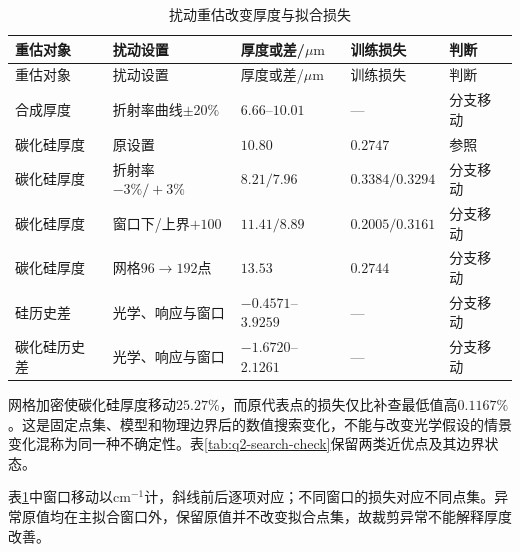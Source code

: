 \begingroup
\small
\setlength{\LTpre}{0.3em}
\setlength{\LTpost}{0.3em}
\begin{longtable}{>{\centering\arraybackslash}p{}>{\centering\arraybackslash}p{}>{\centering\arraybackslash}p{}>{\centering\arraybackslash}p{}>{\centering\arraybackslash}p{}}
\caption{扰动重估改变厚度与拟合损失}\label{tab:10}\\
\toprule
重估对象 & 扰动设置 & 厚度或差/$\mu\mathrm{m}$ & 训练损失 & 判断\\
\midrule
\endfirsthead
\toprule
重估对象 & 扰动设置 & 厚度或差/$\mu\mathrm{m}$ & 训练损失 & 判断\\
\midrule
\endhead
合成厚度 & 折射率曲线$\pm20\%$ & $6.66$--$10.01$ & --- & 分支移动\\
碳化硅厚度 & 原设置 & $10.80$ & $0.2747$ & 参照\\
碳化硅厚度 & 折射率$-3\%/+3\%$ & $8.21/7.96$ & $0.3384/0.3294$ & 分支移动\\
碳化硅厚度 & 窗口下/上界$+100$ & $11.41/8.89$ & $0.2005/0.3161$ & 分支移动\\
碳化硅厚度 & 网格$96\to192$点 & $13.53$ & $0.2744$ & 分支移动\\
硅历史差 & 光学、响应与窗口 & $-0.4571$--$3.9259$ & --- & 分支移动\\
碳化硅历史差 & 光学、响应与窗口 & $-1.6720$--$2.1261$ & --- & 分支移动\\
\bottomrule
\end{longtable}
\endgroup

网格加密使碳化硅厚度移动$25.27\%$，而原代表点的损失仅比补查最低值高$0.1167\%$。这是固定点集、模型和物理边界后的数值搜索变化，不能与改变光学假设的情景变化混称为同一种不确定性。表\ref{tab:q2-search-check}保留两类近优点及其边界状态。

表\ref{tab:10}中窗口移动以$\mathrm{cm}^{-1}$计，斜线前后逐项对应；不同窗口的损失对应不同点集。异常原值均在主拟合窗口外，保留原值并不改变拟合点集，故裁剪异常不能解释厚度改善。


